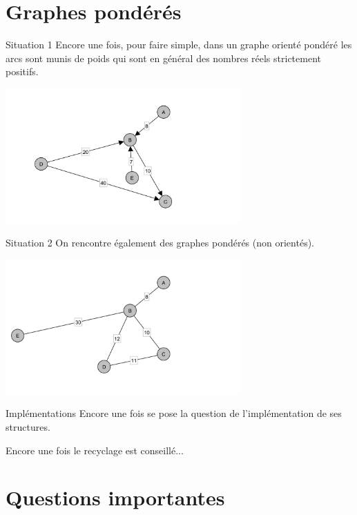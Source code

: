 \documentclass[10pt]{beamer}
\begin{document}
\section{Graphes pondérés}

\begin{frame}{Situation 1}
Encore une fois, pour faire simple, dans un \alert{graphe orienté pondéré} les arcs sont munis de poids qui sont en général des nombres réels strictement positifs.
\begin{center}
\includegraphics[width=9cm]{img/graphpo}
\end{center}
\end{frame}

\begin{frame}{Situation 2}
On rencontre également des \alert{graphes pondérés} (non orientés).
\begin{center}
\includegraphics[width=9cm]{img/graphp}
\end{center}
\end{frame}

\begin{frame}{Implémentations}
Encore une fois se pose la question de l'implémentation de ses structures.\pause

Encore une fois le recyclage est conseillé...
\end{frame}

\section{Questions importantes}
\end{document}

